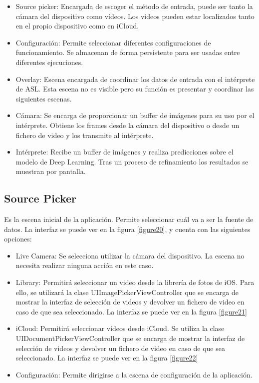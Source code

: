 \documentclass[../main.tex]{subfiles}
\begin{document}
\begin{itemize}
    \item Source picker: Encargada de escoger el método de entrada, puede ser tanto la cámara del dispositivo como vídeos. Los videos pueden estar localizados tanto en el propio dispositivo como en iCloud.
    \item Configuración: Permite seleccionar diferentes configuraciones de funcionamiento. Se almacenan de forma persistente para ser usadas entre diferentes ejecuciones.
    \item Overlay: Escena encargada de coordinar los datos de entrada con el intérprete de ASL. Esta escena no es visible pero su función es presentar y coordinar las siguientes escenas.
    \item Cámara: Se encarga de proporcionar un buffer de imágenes para su uso por el intérprete. Obtiene los frames desde la cámara del dispositivo o desde un fichero de video y los transmite al intérprete.
    \item Intérprete: Recibe un buffer de imágenes y realiza predicciones sobre el modelo de Deep Learning. Tras un proceso de refinamiento los resultados se muestran por pantalla. 
\end{itemize}

\subsection{Source Picker}

Es la escena inicial de la aplicación. Permite seleccionar cuál va a ser la fuente de datos. La interfaz se puede ver en la figura \ref{figure20}, y cuenta con las siguientes opciones:

\begin{itemize}
    \item Live Camera: Se selecciona utilizar la cámara del dispositivo. La escena no necesita realizar ninguna acción en este caso.
    \item Library: Permitirá seleccionar un video desde la librería de fotos de iOS. Para ello, se utilizará la clase UIImagePickerViewController que se encarga de mostrar la interfaz de selección de videos y devolver un fichero de video en caso de que sea seleccionado. La interfaz se puede ver en la figura \ref{figure21}
    \item iCloud: Permitirá seleccionar vídeos desde iCloud. Se utiliza la clase UIDocumentPickerViewController que se encarga de mostrar la interfaz de selección de videos y devolver un fichero de video en caso de que sea seleccionado. La interfaz se puede ver en la figura \ref{figure22}
    \item Configuración: Permite dirigirse a la escena de configuración de la aplicación.
\end{itemize}
\end{document}
